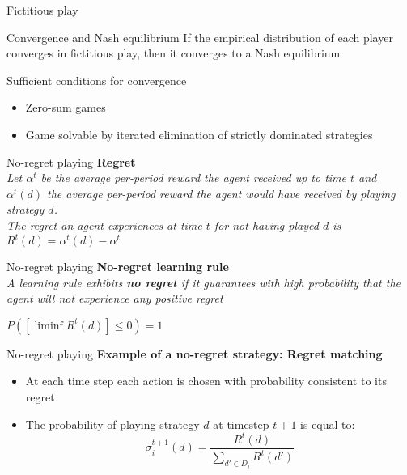 \begin{frame}{Fictitious play}
    \begin{block}{Convergence and Nash equilibrium}
        If the empirical distribution of each player converges in fictitious play, then it converges to a Nash equilibrium
    \end{block}
    \begin{block}{Sufficient conditions for convergence}
        \begin{itemize}
            \item Zero-sum games
            \item Game solvable by iterated elimination of strictly dominated strategies
        \end{itemize}
    \end{block}
\end{frame}


\begin{frame}{No-regret playing}
    \textbf{Regret}\\
    \textit{Let $\alpha^t$ be the average per-period reward the agent received up to time $t$ and $\alpha^t(d)$ the average per-period reward the agent would have received by playing strategy $d$.}\\
    \textit{The regret an agent experiences at time $t$ for not having played $d$ is $R^t(d)=\alpha^t(d)-\alpha^t$}
\end{frame}

\begin{frame}{No-regret playing}
    \textbf{No-regret learning rule}\\
    \textit{A learning rule exhibits \textbf{no regret} if it guarantees with high probability that the agent will not experience any positive regret}
    \begin{center}
        $P([\liminf R^t(d)]\leq 0)=1$
    \end{center}
\end{frame}

\begin{frame}{No-regret playing}
    \textbf{Example of a no-regret strategy: Regret matching}\\
    \begin{itemize}
        \item At each time step each action is chosen with probability consistent to its regret
        \item The probability of playing strategy $d$ at timestep $t+1$ is equal to:
        \[
            \sigma_i^{t+1}(d)= \frac{R^t(d)}{\sum_{d'\in D_i} R^t(d')}
        \]
    \end{itemize}
\end{frame}

